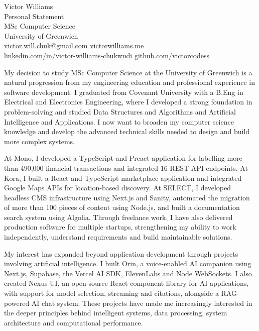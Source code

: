 \documentclass[11pt,a4paper]{article}
\begin{document}
\begin{center}
{\Large Victor Williams}\\[0.4em]
Personal Statement\\[0.15em]
MSc Computer Science\\
University of Greenwich\\[0.4em]
{\small
\href{mailto:victor.will.chuk@gmail.com}{victor.will.chuk@gmail.com}
\quad
\href{https://www.victorwilliams.me/}{victorwilliams.me}\\[0.15em]
\href{https://www.linkedin.com/in/victor-williams-chukwudi/}{linkedin.com/in/victor-williams-chukwudi}
\quad
\href{https://github.com/victorcodess}{github.com/victorcodess}
}
\end{center}

\vspace{0.2em}

My decision to study MSc Computer Science at the University of Greenwich is a natural progression from my engineering education and professional experience in software development. I graduated from Covenant University with a B.Eng in Electrical and Electronics Engineering, where I developed a strong foundation in problem-solving and studied Data Structures and Algorithms and Artificial Intelligence and Applications. I now want to broaden my computer science knowledge and develop the advanced technical skills needed to design and build more complex systems.

At Mono, I developed a TypeScript and Preact application for labelling more than 490,000 financial transactions and integrated 16 REST API endpoints. At Kora, I built a React and TypeScript marketplace application and integrated Google Maps APIs for location-based discovery. At SELECT, I developed headless CMS infrastructure using Next.js and Sanity, automated the migration of more than 100 pieces of content using Node.js, and built a documentation search system using Algolia. Through freelance work, I have also delivered production software for multiple startups, strengthening my ability to work independently, understand requirements and build maintainable solutions.

My interest has expanded beyond application development through projects involving artificial intelligence. I built Orin, a voice-enabled AI companion using Next.js, Supabase, the Vercel AI SDK, ElevenLabs and Node WebSockets. I also created Nexus UI, an open-source React component library for AI applications, with support for model selection, streaming and citations, alongside a RAG-powered AI chat system. These projects have made me increasingly interested in the deeper principles behind intelligent systems, data processing, system architecture and computational performance.
\end{document}
